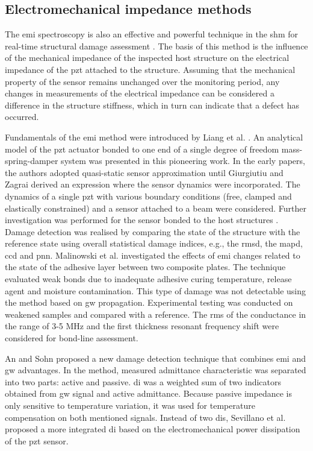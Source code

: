 \subsection{Electromechanical impedance methods}
The \ac{emi} spectroscopy is also an effective and powerful technique in the \ac{shm} for real-time structural damage assessment \cite{park2003overview}.
The basis of this method is the influence of the mechanical impedance of the inspected host structure on the electrical impedance of the \ac{pzt} attached to the structure.
Assuming that the mechanical property of the sensor remains unchanged over the monitoring period, any changes in measurements of the electrical impedance can be considered a difference in the structure stiffness, which in turn can indicate that a defect has occurred.

Fundamentals of the \ac{emi} method were introduced by Liang et al. \cite{liang1994impedance}.
An analytical model of the \ac{pzt} actuator bonded to one end of a single degree of freedom mass-spring-damper system was presented in this pioneering work.
In the early papers, the authors adopted quasi-static sensor approximation until  Giurgiutiu and Zagrai \cite{giurgiutiu2000characterization} derived an expression where the sensor dynamics were incorporated.
The dynamics of a single \ac{pzt} with various boundary conditions (free, clamped and elastically constrained) and a sensor attached to a beam were considered.
Further investigation was performed for the sensor bonded to the host structures \cite{zagrai2001electro, giurgiutiu2005damage}.
Damage detection was realised by comparing the state of the structure with the reference state using overall statistical damage indices, e.g., the \ac{rmsd}, the \ac{mapd}, \ac{ccd} and \ac{pnn}.
Malinowski et al. \cite{malinowski2014characterisation, malinowski2015use} investigated the effects of \ac{emi} changes related to the state of the adhesive layer between two composite plates.
The technique evaluated weak bonds due to inadequate adhesive curing temperature, release agent and moisture contamination.
This type of damage was not detectable using the method based on \ac{gw} propagation.
Experimental testing was conducted on weakened samples and compared with a reference.
The \ac{rms} of the conductance in the range of 3-5 MHz and the first thickness resonant frequency shift were considered for bond-line assessment.

An and Sohn \cite{an2012integrated} proposed a new damage detection technique that combines \ac{emi} and \ac{gw} advantages.
In the method, measured admittance characteristic was separated into two parts: active and passive.
\Ac{di} was a weighted sum of two indicators obtained from \ac{gw} signal and active admittance.
Because passive impedance is only sensitive to temperature variation, it was used for temperature compensation on both mentioned signals.
Instead of two \acp{di}, Sevillano et al. \cite{sevillano2016damage} proposed a more integrated \ac{di} based on the electromechanical power dissipation of the \ac{pzt} sensor.

